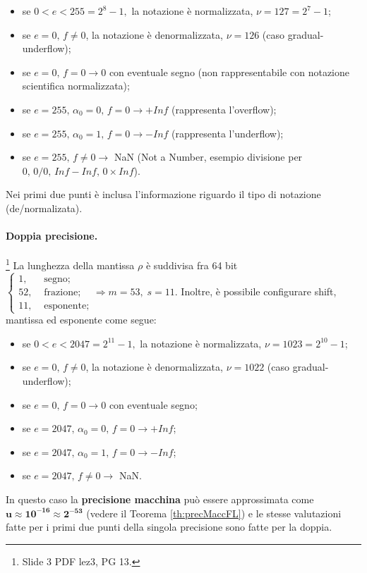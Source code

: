 \begin{itemize}
    \item se $0<e<255=2^8-1,$ la notazione è normalizzata, $\nu=127=2^7-1$;
    \item se $e=0,\, f\neq 0$, la notazione è denormalizzata, $\nu=126$ (caso gradual-underflow);
    \item se $e=0,\, f=0\rightarrow 0$ con eventuale segno (non rappresentabile con notazione scientifica normalizzata);
    \item se $e=255,\,\alpha_0=0,\,f=0\rightarrow +Inf$ (rappresenta l'overflow);
    \item se $e=255,\,\alpha_0=1,\,f=0\rightarrow -Inf$ (rappresenta l'underflow);
    \item se $e=255, \,f\neq 0 \rightarrow$ NaN (Not a Number, esempio divisione per $0,\, 0/0,\, Inf-Inf,\, 0\times Inf$).
\end{itemize}
Nei primi due punti è inclusa l'informazione riguardo il tipo di notazione (de/normalizata).

\paragraph{Doppia precisione.}\footnote{Slide 3 PDF lez3, PG 13.}
La lunghezza della mantissa $\rho$ è suddivisa fra 64 bit $\begin{cases}
    1, &\text{ segno};\\
    52, &\text{ frazione};\\
    11, &\text{ esponente};
\end{cases}\Rightarrow m=53,\; s=11$.
Inoltre, è possibile configurare shift, mantissa ed esponente come segue:
\begin{itemize}
    \item se $0<e<2047=2^{11}-1,$ la notazione è normalizzata, $\nu=1023=2^{10}-1$;
    \item se $e=0,\,f\neq 0$, la notazione è denormalizzata, $\nu=1022$ (caso gradual-underflow);
    \item se $e=0,\,f=0\rightarrow 0$ con eventuale segno;
    \item se $e=2047,\,\alpha_0=0,\,f=0\rightarrow +Inf$;
    \item se $e=2047,\,\alpha_0=1,\,f=0\rightarrow -Inf$;
    \item se $e=2047,\,f\neq 0 \rightarrow$ NaN.
\end{itemize}
In questo caso la \textbf{precisione macchina} può essere approssimata come $\boldsymbol{u\approx 10^{-16}\approx 2^{-53}}$ (vedere il Teorema \ref{th:precMaccFL}) e le stesse valutazioni fatte per i primi due punti della singola precisione sono fatte per la doppia.

